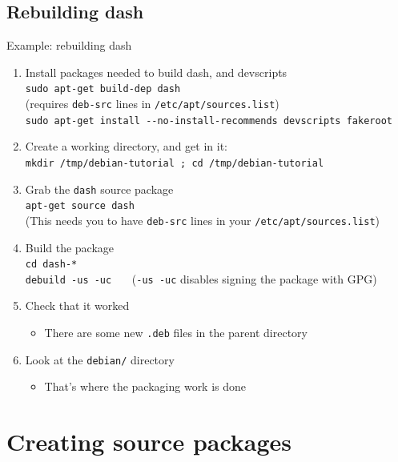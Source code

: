 \documentclass[10pt,final]{beamer}
\begin{document}
\subsection{Rebuilding dash}
\begin{frame}{Example: rebuilding dash}
\begin{enumerate}
\item Install packages needed to build dash, and devscripts\\
  {\texttt{sudo apt-get build-dep dash}\\ (requires \texttt{deb-src} lines in \texttt{/etc/apt/sources.list})}\\
  {\texttt{sudo apt-get install -{}-no-install-recommends devscripts fakeroot}}
  \hbr
\item Create a working directory, and get in it:\\
 \texttt{mkdir /tmp/debian-tutorial ; cd /tmp/debian-tutorial}
  \hbr
\item Grab the \texttt{dash} source package\\
  \texttt{apt-get source dash}\\ 
  {\small (This needs you to have \texttt{deb-src} lines in your \texttt{/etc/apt/sources.list})}
  \hbr
\item Build the package\\
  {\texttt{cd dash-*\\ debuild -us -uc}} ~~~(\texttt{-us -uc} disables signing the package with GPG)

  \hbr
\item Check that it worked
	\begin{itemize}
		\item  There are some new \texttt{.deb} files in the parent directory
	\end{itemize}
    \hbr
\item Look at the \texttt{debian/} directory
	\begin{itemize}
		\item That's where the packaging work is done
	\end{itemize}
\end{enumerate}
\end{frame}

\section{Creating source packages}
\end{document}
